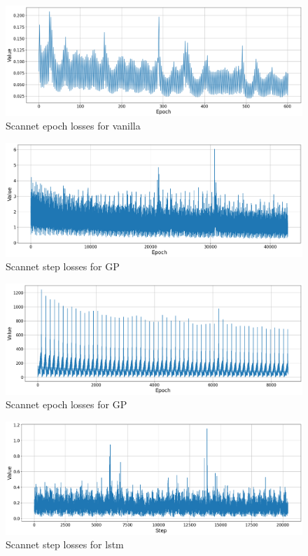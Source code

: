 	\begin{figure}
		\centering
		\includegraphics[width=13cm]{images/scannet_epoch_vanilla_all.png}
		\caption{Scannet epoch losses for vanilla}
		\label{fig:android_result}
	\end{figure}

	\begin{figure}
		\centering
		\includegraphics[width=13cm]{images/scannet_gp_step.png}
		\caption{Scannet step losses for GP}
		\label{fig:android_result}
	\end{figure}

	\begin{figure}
		\centering
		\includegraphics[width=13cm]{images/scannet_gp_epoch_all.png}
		\caption{Scannet epoch losses for GP}
		\label{fig:android_result}
	\end{figure}

	\begin{figure}
		\centering
		\includegraphics[width=13cm]{images/scannet_step_lstm.png}
		\caption{Scannet step losses for lstm}
		\label{fig:android_result}
	\end{figure}

